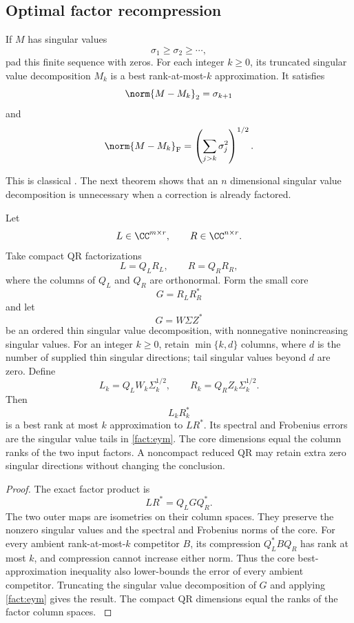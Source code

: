 \subsection{Optimal factor recompression}\label{main:subsection:004}

\begin{standardfact}\label{main:standardfact:001}\label{fact:eym}
If \(M\) has singular values
\[
\sigma_1\geq\sigma_2\geq\cdots,
\]
pad this finite sequence with zeros. For each integer $k\ge0$, its truncated singular value decomposition $M_k$ is a best rank-at-most-$k$ approximation. It satisfies
\[
\norm{M-M_k}_2=\sigma_{k+1}
\]
and
\[
\norm{M-M_k}_{\rm F}
=
\left(
\sum_{j>k}\sigma_j^2
\right)^{1/2}.
\]
\end{standardfact}

This is classical \cite{EckartYoung1936,Mirsky1960}. The next theorem shows that an \(n\) dimensional singular value decomposition is unnecessary when a correction is already factored.

\begin{theorem}\label{main:theorem:011}\label{thm:small_core_recompression}
Let
\[
L\in\CC^{m\times r},
\qquad
R\in\CC^{n\times r}.
\]
Take compact QR factorizations
\[
L=Q_LR_L,
\qquad
R=Q_RR_R,
\]
where the columns of \(Q_L\) and \(Q_R\) are orthonormal. Form the small core
\[
G=R_LR_R^*
\]
and let
\[
G=W\Sigma Z^*
\]
be an ordered thin singular value decomposition, with nonnegative nonincreasing singular values. For an integer $k\ge0$, retain $\min\{k,d\}$ columns, where $d$ is the number of supplied thin singular directions; tail singular values beyond $d$ are zero. Define
\[
L_k=Q_LW_k\Sigma_k^{1/2},
\qquad
R_k=Q_RZ_k\Sigma_k^{1/2}.
\]
Then
\[
L_kR_k^*
\]
is a best rank at most \(k\) approximation to \(LR^*\). Its spectral and Frobenius errors are the singular value tails in \cref{fact:eym}. The core dimensions equal the column ranks of the two input factors. A noncompact reduced QR may retain extra zero singular directions without changing the conclusion.
\end{theorem}

\begin{proof}\label{main:proof:023}
The exact factor product is
\[
LR^*
=
Q_LGQ_R^*.
\]
The two outer maps are isometries on their column spaces. They preserve the nonzero singular values and the spectral and Frobenius norms of the core. For every ambient rank-at-most-$k$ competitor $B$, its compression $Q_L^*BQ_R$ has rank at most $k$, and compression cannot increase either norm. Thus the core best-approximation inequality also lower-bounds the error of every ambient competitor. Truncating the singular value decomposition of \(G\) and applying \cref{fact:eym} gives the result. The compact QR dimensions equal the ranks of the factor column spaces.
\label{main:proof:023:end}\end{proof}

